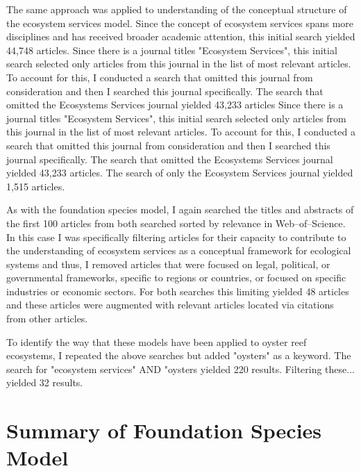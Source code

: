 \documentclass{article}
\begin{document}
The same approach was applied to understanding of the conceptual structure of the ecosystem services model. Since the concept of ecosystem services spans more disciplines and has received broader academic attention, this initial search yielded 44,748 articles. Since there is a journal titles "Ecosystem Services", this initial search selected only articles from this journal in the list of most relevant articles. To account for this, I conducted a search that omitted this journal from consideration and then I searched this journal specifically. The search that omitted the Ecosystems Services journal yielded 43,233 articles Since there is a journal titles "Ecosystem Services", this initial search selected only articles from this journal in the list of most relevant articles. To account for this, I conducted a search that omitted this journal from consideration and then I searched this journal specifically. The search that omitted the Ecosystems Services journal yielded 43,233 articles. The search of only the Ecosystem Services journal yielded 1,515 articles.  

As with the foundation species model, I again searched the titles and abstracts of the first 100 articles from both searched sorted by relevance in Web--of--Science. In this case I was specifically filtering articles for their capacity to contribute to the understanding of ecosystem services as a conceptual framework for ecological systems and thus, I removed articles that were focused on legal, political, or governmental frameworks, specific to regions or countries, or focused on specific industries or economic sectors. For both searches this limiting yielded 48 articles and these articles were augmented with relevant articles located via citations from other articles.

To identify the way that these models have been applied to oyster reef ecosystems, I repeated the above searches but added "oysters" as a keyword. The search for "ecosystem services" AND "oysters yielded 220 results. Filtering these... yielded 32 results.

\section*{Summary of Foundation Species Model}
\label{sec:found_sp_summary}
\end{document}
